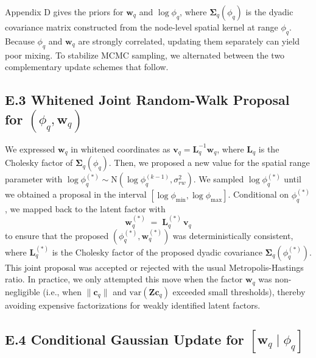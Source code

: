 \documentclass{article}
\begin{document}
Appendix D gives the priors for $\mathbf{w}_q$ and $\log\phi_q$,
where $\boldsymbol\Sigma_q(\phi_q)$ is the dyadic covariance matrix constructed from the node-level spatial kernel at range $\phi_q$. Because $\phi_q$ and $\mathbf{w}_q$ are strongly correlated, updating them separately can yield poor mixing. To stabilize MCMC sampling, we alternated between the two complementary update schemes that follow.

\subsection*{E.3 Whitened Joint Random-Walk Proposal for $(\phi_q,\mathbf{w}_q)$}

We expressed $\mathbf{w}_q$ in whitened coordinates as $\mathbf{v}_q=\mathbf{L}_q^{-1}\mathbf{w}_q$, where $\mathbf{L}_q$ is the Cholesky factor of $\boldsymbol\Sigma_q(\phi_q)$. Then, we proposed a new value for the spatial range parameter with $\log\phi_q^{(*)}\sim\text{N}(\log\phi_q^{(k-1)},\sigma^2_{rw})$. We sampled $\log\phi_q^{(*)}$ until we obtained a proposal in the interval $[\log\phi_{\min},\log\phi_{\max}]$.
Conditional on $\phi_q^{(*)}$, we mapped back to the latent factor with
$$\mathbf{w}_q^{(*)} \;=\; \mathbf{L}_q^{(*)}\,\mathbf{v}_q$$
to ensure that the proposed $(\phi_q^{(*)},\mathbf{w}_q^{(*)})$ was deterministically consistent, where $\mathbf{L}_q^{(*)}$ is the Cholesky factor of the proposed dyadic covariance $\boldsymbol\Sigma_q(\phi_q^{(*)})$. This joint proposal was accepted or rejected with the usual Metropolis-Hastings ratio. In practice, we only attempted this move when the factor $\mathbf{w}_q$ was non-negligible (i.e., when $\|\mathbf{c}_{q}\|$ and $\mathrm{var}(\mathbf{Zc}_{q})$ exceeded small thresholds), thereby avoiding expensive factorizations for weakly identified latent factors.

\subsection*{E.4 Conditional Gaussian Update for $[\mathbf{w}_q\mid\phi_q]$}

\end{document}
